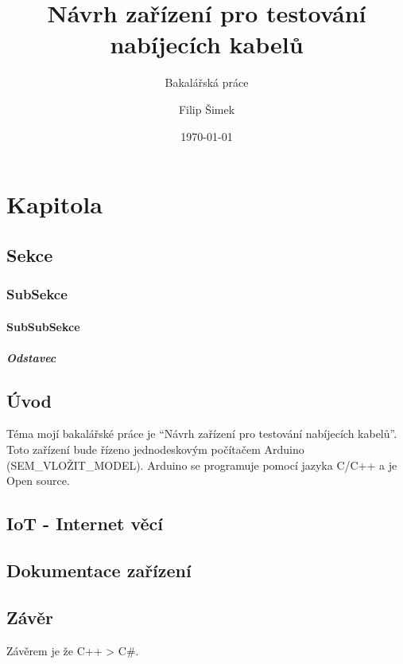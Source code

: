 \documentclass[12pt,a4paper,titlepage]{scrreprt}
\title{\vspace{6cm}Návrh zařízení pro testování nabíjecích kabelů}
\subtitle{Bakalářská práce}
\author{Filip Šimek}
\date{\today}
\begin{document}
	\maketitle 

	\tableofcontents
	\newpage
	
	
	
	\chapter{Kapitola}
	\section {Sekce}
	\subsection {SubSekce}
	\subsubsection {SubSubSekce}
	\paragraph{Odstavec}
	
	\section {Úvod}
	Téma mojí bakalářské práce je “Návrh zařízení pro testování nabíjecích kabelů”. Toto zařízení bude řízeno jednodeskovým počítačem Arduino (SEM\_VLOŽIT\_MODEL). Arduino se programuje pomocí jazyka C/C++ a je Open source.
	
	\section{IoT - Internet věcí}
	
	
	\section{Dokumentace zařízení}
	
	 \section*{Závěr}
	Závěrem je že C++ > C\#.

	\newpage
	\listoffigures
	\listoftables
	\lstlistoflistings
\end{document}
